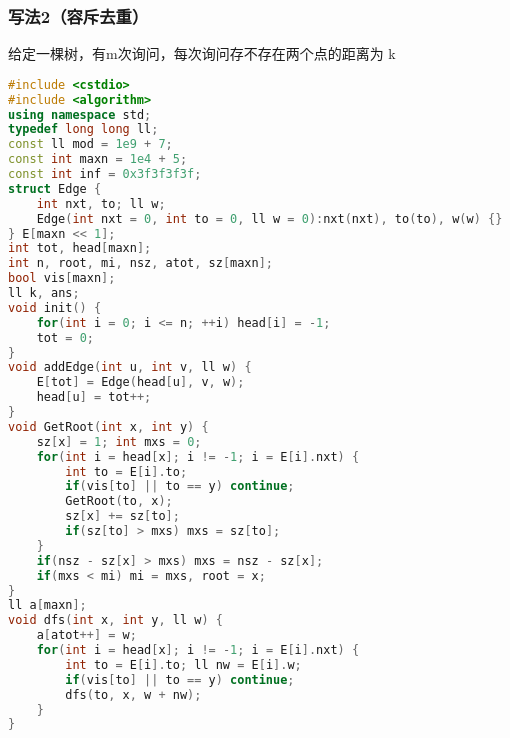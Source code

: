 \subsubsection{写法2（容斥去重）}

给定一棵树，有m次询问，每次询问存不存在两个点的距离为 k

\begin{lstlisting}[language=C++]
#include <cstdio>
#include <algorithm>
using namespace std;
typedef long long ll;
const ll mod = 1e9 + 7;
const int maxn = 1e4 + 5;
const int inf = 0x3f3f3f3f;
struct Edge {
    int nxt, to; ll w;
    Edge(int nxt = 0, int to = 0, ll w = 0):nxt(nxt), to(to), w(w) {}
} E[maxn << 1];
int tot, head[maxn];
int n, root, mi, nsz, atot, sz[maxn];
bool vis[maxn];
ll k, ans;
void init() {
    for(int i = 0; i <= n; ++i) head[i] = -1;
    tot = 0;
}
void addEdge(int u, int v, ll w) {
    E[tot] = Edge(head[u], v, w);
    head[u] = tot++;
}
void GetRoot(int x, int y) {
    sz[x] = 1; int mxs = 0;
    for(int i = head[x]; i != -1; i = E[i].nxt) {
        int to = E[i].to;
        if(vis[to] || to == y) continue;
        GetRoot(to, x);
        sz[x] += sz[to];
        if(sz[to] > mxs) mxs = sz[to];
    }
    if(nsz - sz[x] > mxs) mxs = nsz - sz[x];
    if(mxs < mi) mi = mxs, root = x;
}
ll a[maxn];
void dfs(int x, int y, ll w) {
    a[atot++] = w;
    for(int i = head[x]; i != -1; i = E[i].nxt) {
        int to = E[i].to; ll nw = E[i].w;
        if(vis[to] || to == y) continue;
        dfs(to, x, w + nw);
    }
}


\end{lstlisting}
